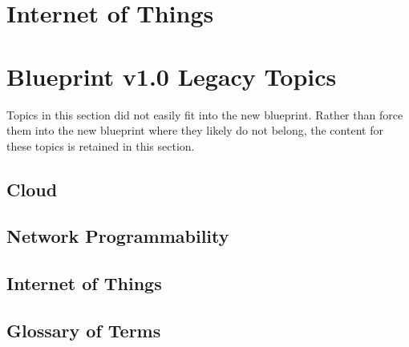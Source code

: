 \documentclass{article}
\begin{document}
\newpage
\section{Internet of Things}
\renewcommand{\imgpath}{content/iot/a3a-archdeploy/img/}






\newpage
\section{Blueprint v1.0 Legacy Topics}
Topics in this section did not easily fit into the new blueprint. Rather than
force them into the new blueprint where they likely do not belong, the content
for these topics is retained in this section.
\renewcommand{\imgpath}{content/legacy/img/}
\subsection{Cloud}



\subsection{Network Programmability}



\subsection{Internet of Things}


\newpage
\subsection{Glossary of Terms}

\end{document}
